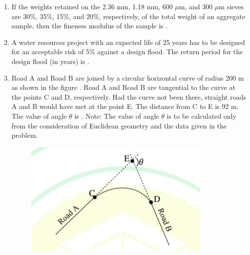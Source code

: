 \documentclass[journal,12pt,onecolumn]{article}
\theoremstyle{remark}
\begin{document}
\begin{enumerate}
\hfill{}
\begin{enumerate}
\end{enumerate}

\item If the weights retained on the 2.36 mm, 1.18 mm, 600 $\mu$m, and 300 $\mu$m sieves are 30\%, 35\%, 15\%, and 20\%, respectively, of the total weight of an aggregate sample, then the fineness modulus of the sample is \underline{\hspace{2cm}} .

\hfill{}

\item A water resources project with an expected life of 25 years has to be designed for an acceptable risk of 5\% against a design flood. The return period for the design flood (in years) is \underline{\hspace{2cm}} .

\hfill{}

\item Road A and Road B are joined by a circular horizontal curve of radius 200 m as shown in the figure . Road A and Road B are tangential to the curve at the points C and D, respectively. Had the curve not been there, straight roads A and B would have met at the point E. The distance from C to E is 92 m. The value of angle $\theta$  is \underline{\hspace{2cm}} .
Note: The value of angle $\theta$ is to be calculated only from the consideration of Euclidean geometry and the data given in the problem.
\begin{figure}[H]
    \centering
    \includegraphics[width=0.7\columnwidth]{figs/1q-35.jpg}
    \caption{}
    \label{fig:q35}
\end{figure}


\end{enumerate}
\end{document}
